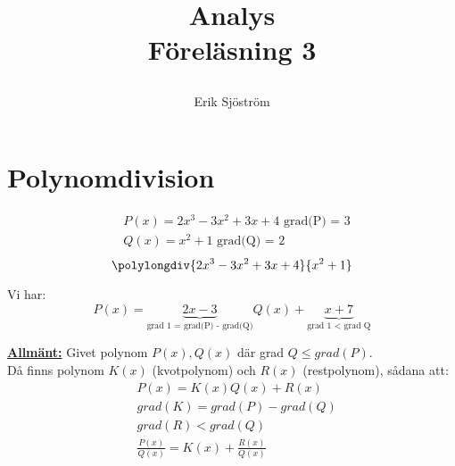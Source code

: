 

\usepackage{polynom}

\title{
     Analys\\
     Föreläsning 3
    \author{Erik Sjöström}
}

\maketitle

\section{Polynomdivision} %
\label{sec:polynomdivision}

\begin{Ex}
    \begin{align*}
        &P(x) = 2x^3 - 3x^2 + 3x + 4 \mbox{ grad(P) = 3}\\
        &Q(x) = x^2 + 1 \mbox{ grad(Q) = 2}
    \end{align*}
    \[
    \polylongdiv{2x^3 - 3x^2 + 3x + 4}{x^2 + 1}
    \]

    Vi har:
    \[
    P(x) = \underbrace{2x - 3}_\text{grad 1 = grad(P) - grad(Q)} Q(x) + \underbrace{x + 7}_\text{grad 1 $<$ grad Q}
    \]
\end{Ex}
\textbf{\underline{Allmänt:}} Givet polynom $P(x), Q(x)$ där grad $Q \le grad(P)$.\\
Då finns polynom $K(x)$ (kvotpolynom) och $R(x)$ (restpolynom), sådana att:
\begin{align*}
	&P(x) = K(x)Q(x) + R(x)\\
	&grad(K) = grad(P) - grad(Q)\\
	&grad(R) < grad(Q)\\
	&\frac{P(x)}{Q(x)} = K(x) + \frac{R(x)}{Q(x)}
\end{align*}
